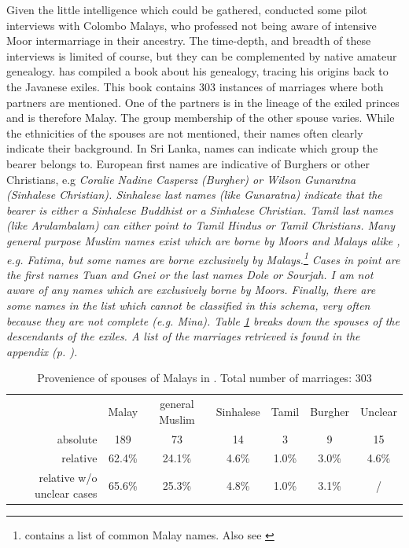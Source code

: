Given the little intelligence which could be gathered, \citet{Ansaldo2008genesis} conducted some pilot interviews with Colombo Malays, who professed not being aware of intensive Moor intermarriage in their ancestry. The time-depth, and breadth of these interviews is limited of course, but they can be complemented by native amateur genealogy. \citet{ArfinBurah} has compiled a book about his genealogy, tracing his origins back to the Javanese exiles. This book contains 303 instances of marriages where both partners are mentioned. One of the partners is in the lineage of the exiled princes and is therefore Malay. The group membership of the other spouse varies. While the ethnicities of the spouses are not mentioned, their names often clearly indicate their background. In Sri Lanka, names can indicate which group the bearer belongs to. European first names are indicative of Burghers or other Christians, e.g \em Coralie Nadine Caspersz \em (Burgher) or \em Wilson Gunaratna \em (Sinhalese Christian). Sinhalese last names (like \em Gunaratna\em) indicate that the bearer is either a Sinhalese Buddhist or a Sinhalese Christian. Tamil last names (like \em Arulambalam\em) can either point to Tamil Hindus or Tamil Christians. Many general purpose Muslim names exist which are borne by Moors and Malays alike \citep[cf.][]{Hussainmiya1987, Ansaldo2008genesis}, e.g. \em Fatima\em, but some names are borne exclusively by Malays.\footnote{\citet[436]{Hussein2007} contains a list of common Malay names. Also see \citet[8]{Hussainmiya1987}} Cases in point are the first names \em Tuan \em and \em Gnei \em or the last names \em Dole \em or \em Sourjah\em. I am not aware of any names which are exclusively borne by Moors. Finally, there are some names in the list which cannot be classified in this schema, very often because they are not complete (e.g. \em Mina\em). Table \ref{tab:slmbg:marriage} breaks down the spouses of the descendants of the exiles. A list of the marriages retrieved is found in the appendix (p. \pageref{sec:marriages}).\\

\begin{table}[h]
\begin{tabular}{rcccccc}
	& Malay & general Muslim & Sinhalese 	& Tamil & Burgher 	& Unclear\\
absolute& 189	& 73		& 14		& 3	& 9		& 15\\
relative& 62.4\%& 24.1\%	& 4.6\%		& 1.0\%	& 3.0\%		& 4.6\% \\
relative w/o unclear cases&65.6\% & 25.3\%&4.8\%&  1.0\%   	& 3.1\%		& / \\
\end{tabular}
\caption[Provenience of spouses of Malays]{Provenience of spouses of Malays in \citet{ArfinBurah}. Total number of marriages: 303}
\label{tab:slmbg:marriage}
\end{table}

